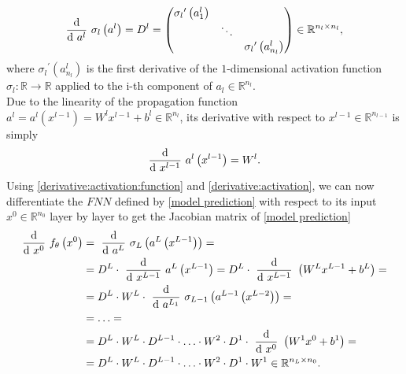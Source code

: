 \begin{equation}
    \label{derivative:activation:function}
    \frac{\textup{d}}{\textup{d} \ a^{l}} \ \sigma_{l} \left(a^l\right) = D^{l} = \begin{pmatrix} {\sigma_{l}}^{\prime} \left( a^{l}_1 \right) & & \\ & \ddots & \\ & & {\sigma_{l}}^{\prime} \left( a^{l}_{n_l} \right) \end{pmatrix} \in \mathbb{R}^{n_l \times n_l}, 
\end{equation}
where ${\sigma_{l}}^{\prime} \left( a^{l}_{n_l} \right)$ is the first derivative of the $1$-dimensional activation function $\sigma_{l} \colon \mathbb{R} \to \mathbb{R}$ applied to the i-th component of $a_l \in \mathbb{R}^{n_l}$. \\
Due to the linearity of the propagation function $a^l = a^l\left(x^{l-1}\right) = W^{l} x^{l-1} + b^{l} \in \mathbb{R}^{n_l}$, its derivative with respect to $x^{l-1} \in \mathbb{R}^{n_{l-1}}$ is simply
\begin{equation}
    \label{derivative:activation}
    \frac{\textup{d}}{\textup{d} \ x^{l-1}} \ a^{l}\left(x^{l-1}\right) = W^l.
\end{equation}
Using \cref{derivative:activation:function} and \cref{derivative:activation}, we can now differentiate the $FNN$ defined by \cref{model prediction} with respect to its input $x^0 \in \mathbb{R}^{n_0}$ layer by layer to get the Jacobian matrix of \cref{model prediction}
\begin{equation} 
    \label{first order derivative}
    \begin{aligned}
        \frac{\textup{d}}{\textup{d} \ x^0} \  f_{\theta}\left(x^0\right) & =\ \frac{\textup{d}}{\textup{d} \ a^{L}} \ \sigma_{L} \left(a^{L}\left(x^{L-1}\right)\right) = \\
        & = D^L \cdot\ \frac{\textup{d}}{\textup{d} \ x^{L-1}} \ a^{L}\left(x^{L-1}\right) = D^L \cdot\ \frac{\textup{d}}{\textup{d} \ x^{L-1}} \ \left(W^{L} x^{L-1} + b^{L}\right) = \\
        & = D^L \cdot W^L \cdot\ \frac{\textup{d}}{\textup{d} \ a^{L_1}} \ \sigma_{L-1} \left(a^{L-1}\left(x^{L-2}\right)\right) = \\
        & = \ldots = \\
        & = D^L \cdot W^L \cdot D^{L-1} \cdot \ldots \cdot W^2 \cdot D^1 \cdot\ \frac{\textup{d}}{\textup{d} \ x^{0}} \ \left(W^{1} x^{0} + b^{1}\right) = \\
        & = D^L \cdot W^L \cdot D^{L-1} \cdot \ldots \cdot W^2 \cdot D^1 \cdot W^{1} \in \mathbb{R}^{n_L \times n_0}.
    \end{aligned} 
\end{equation} 

